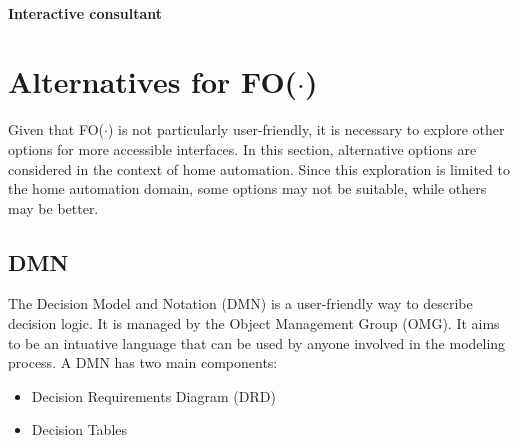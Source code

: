 \documentclass[11pt,a4paper]{report}
\newcommand{\fodot}{FO($\cdot$)\xspace}
\begin{document}

\paragraph{Interactive consultant}


\newpage

\section{Alternatives for \fodot}
Given that \fodot is not particularly user-friendly, it is necessary to explore other options for more accessible interfaces. In this section, alternative options are considered in the context of home automation. Since this exploration is limited to the home automation domain, some options may not be suitable, while others may be better.

\subsection{DMN}
The Decision Model and Notation (DMN) is a user-friendly way to describe decision logic. It is managed by the Object Management Group (OMG). It aims to be an intuative language that can be used by anyone involved in the modeling process. A DMN has two main components:
\begin{itemize}
	\item Decision Requirements Diagram (DRD)
    \item Decision Tables
\end{itemize}
\end{document}
